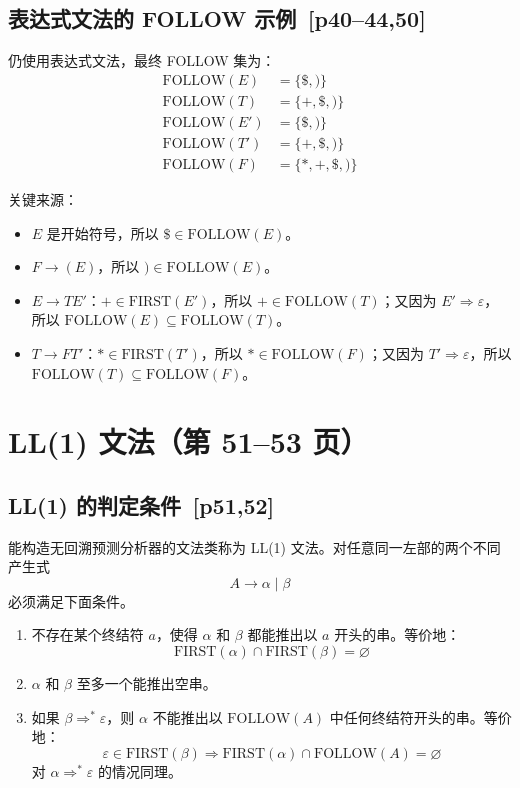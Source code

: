 \documentclass[UTF8,fontset=none,11pt]{ctexart}
\newenvironment{defbox}[1][]{%
  \par\medskip\noindent{\color{defrule}\rule{\linewidth}{1.1pt}}\par\nopagebreak
  \noindent{\bfseries\color{defrule}#1}\par\nopagebreak\smallskip}%
  {\par\nopagebreak\smallskip\noindent{\color{defrule}\rule{\linewidth}{0.4pt}}\par\medskip}
\newcommand{\pg}[1]{\texorpdfstring{{\small\color{graytext}\,[p#1]}}{ [p#1]}}
\newcommand{\eps}{\varepsilon}
\begin{document}
\subsection{表达式文法的 FOLLOW 示例 \pg{40--44,50}}
仍使用表达式文法，最终 FOLLOW 集为：
\[
\begin{aligned}
\mathrm{FOLLOW}(E)&=\{\$,)\}\\
\mathrm{FOLLOW}(T)&=\{+,\$,)\}\\
\mathrm{FOLLOW}(E')&=\{\$,)\}\\
\mathrm{FOLLOW}(T')&=\{+,\$,)\}\\
\mathrm{FOLLOW}(F)&=\{*,+,\$,)\}
\end{aligned}
\]

关键来源：
\begin{itemize}
  \item \(E\) 是开始符号，所以 \(\$\in\mathrm{FOLLOW}(E)\)。
  \item \(F\to(E)\)，所以 \()\in\mathrm{FOLLOW}(E)\)。
  \item \(E\to TE'\)：\(+\in\mathrm{FIRST}(E')\)，所以 \(+\in\mathrm{FOLLOW}(T)\)；又因为 \(E'\Rightarrow\eps\)，所以 \(\mathrm{FOLLOW}(E)\subseteq\mathrm{FOLLOW}(T)\)。
  \item \(T\to FT'\)：\(*\in\mathrm{FIRST}(T')\)，所以 \(*\in\mathrm{FOLLOW}(F)\)；又因为 \(T'\Rightarrow\eps\)，所以 \(\mathrm{FOLLOW}(T)\subseteq\mathrm{FOLLOW}(F)\)。
\end{itemize}

\section{LL(1) 文法（第 51--53 页）}

\subsection{LL(1) 的判定条件 \pg{51,52}}
\begin{defbox}[LL(1) 文法]
能构造无回溯预测分析器的文法类称为 LL(1) 文法。对任意同一左部的两个不同产生式
\[
A\to\alpha\mid\beta
\]
必须满足下面条件。
\end{defbox}

\begin{enumerate}
  \item 不存在某个终结符 \(a\)，使得 \(\alpha\) 和 \(\beta\) 都能推出以 \(a\) 开头的串。等价地：
  \[
  \mathrm{FIRST}(\alpha)\cap\mathrm{FIRST}(\beta)=\varnothing
  \]
  \item \(\alpha\) 和 \(\beta\) 至多一个能推出空串。
  \item 如果 \(\beta\Rightarrow^*\eps\)，则 \(\alpha\) 不能推出以 \(\mathrm{FOLLOW}(A)\) 中任何终结符开头的串。等价地：
  \[
  \eps\in\mathrm{FIRST}(\beta)\Rightarrow
  \mathrm{FIRST}(\alpha)\cap\mathrm{FOLLOW}(A)=\varnothing
  \]
  对 \(\alpha\Rightarrow^*\eps\) 的情况同理。
\end{enumerate}
\end{document}
